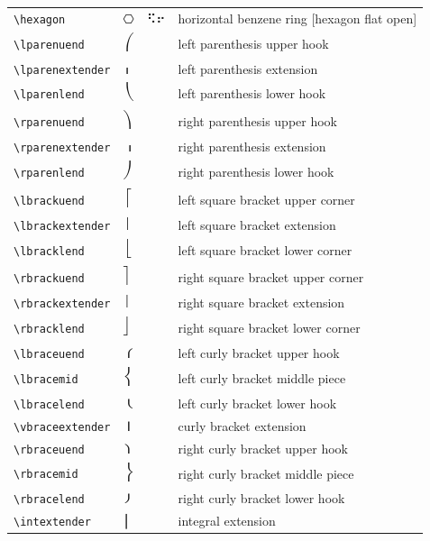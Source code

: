 \documentclass[oneside]{article}
\begin{document}
\begin{longtable}{llll}
\verb|\hexagon| & $\hexagon$ &  ⠫⠖  & {horizontal benzene ring [hexagon flat open]} \\[2ex]
\verb|\lparenuend| & $\lparenuend$ &    & {left parenthesis upper hook} \\[2ex]
\verb|\lparenextender| & $\lparenextender$ &    & {left parenthesis extension} \\[2ex]
\verb|\lparenlend| & $\lparenlend$ &    & {left parenthesis lower hook} \\[2ex]
\verb|\rparenuend| & $\rparenuend$ &    & {right parenthesis upper hook} \\[2ex]
\verb|\rparenextender| & $\rparenextender$ &    & {right parenthesis extension} \\[2ex]
\verb|\rparenlend| & $\rparenlend$ &    & {right parenthesis lower hook} \\[2ex]
\verb|\lbrackuend| & $\lbrackuend$ &    & {left square bracket upper corner} \\[2ex]
\verb|\lbrackextender| & $\lbrackextender$ &    & {left square bracket extension} \\[2ex]
\verb|\lbracklend| & $\lbracklend$ &    & {left square bracket lower corner} \\[2ex]
\verb|\rbrackuend| & $\rbrackuend$ &    & {right square bracket upper corner} \\[2ex]
\verb|\rbrackextender| & $\rbrackextender$ &    & {right square bracket extension} \\[2ex]
\verb|\rbracklend| & $\rbracklend$ &    & {right square bracket lower corner} \\[2ex]
\verb|\lbraceuend| & $\lbraceuend$ &    & {left curly bracket upper hook} \\[2ex]
\verb|\lbracemid| & $\lbracemid$ &    & {left curly bracket middle piece} \\[2ex]
\verb|\lbracelend| & $\lbracelend$ &    & {left curly bracket lower hook} \\[2ex]
\verb|\vbraceextender| & $\vbraceextender$ &    & {curly bracket extension} \\[2ex]
\verb|\rbraceuend| & $\rbraceuend$ &    & {right curly bracket upper hook} \\[2ex]
\verb|\rbracemid| & $\rbracemid$ &    & {right curly bracket middle piece} \\[2ex]
\verb|\rbracelend| & $\rbracelend$ &    & {right curly bracket lower hook} \\[2ex]
\verb|\intextender| & $\intextender$ &    & {integral extension} \\[2ex]

\end{longtable}
\end{document}
